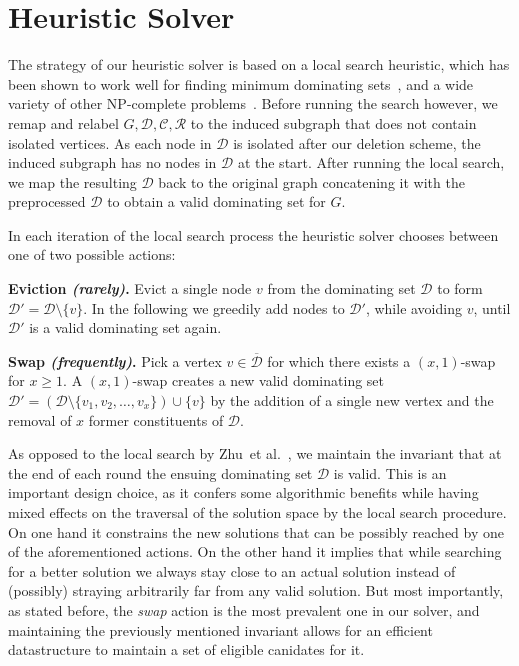 \documentclass[a4paper, USenglish, cleveref, autoref, thm-restate, noalgorithm2e]{socg-lipics-v2021}
\newcommand{\etal}{et al.\xspace}
\newcommand{\domset}{\ensuremath{\mathcal D}\xspace}
\newcommand{\cov}{\ensuremath{\mathcal C}\xspace}
\newcommand{\red}{\ensuremath{\mathcal R}\xspace}
\newcommand{\cdomset}{\ensuremath{\overline{\mathcal D}}\xspace}
\begin{document}
\section{Heuristic Solver}\label{sec:heuristic}
The strategy of our heuristic solver is based on a local search heuristic, which has been shown to work well for finding minimum dominating sets~\cite{DBLP:journals/kbs/ZhuZWSL24}, and a wide variety of other NP-complete problems~\cite{DBLP:journals/jair/CaiSLS13,DBLP:conf/compgeom/MustafaR09}.
Before running the search however, we remap and relabel $G, \domset, \cov, \red$ to the induced subgraph that does not contain isolated vertices.
As each node in $\domset$ is isolated after our deletion scheme, the induced subgraph has no nodes in $\domset$ at the start.
After running the local search, we map the resulting $\domset$ back to the original graph concatening it with the preprocessed $\domset$ to obtain a valid dominating set for $G$. 

In each iteration of the local search process the heuristic solver chooses between one of two possible actions:
\medskip

\noindent
\textbf{Eviction \textit{(rarely)}.} 
Evict a single node $v$ from the dominating set $\domset$ to form $\domset'=\domset\setminus\{v\}$.
In the following we greedily add nodes to $\domset'$, while avoiding $v$, until $\domset'$ is a valid dominating set again.
\medskip

\noindent
\textbf{Swap \textit{(frequently)}.}
Pick a vertex $v \in \cdomset$ for which there exists a $(x,1)$-swap for $x\geq 1$.
%
A $(x,1)$-swap creates a new valid dominating set $\domset' = (\domset\setminus \{v_1,v_2,\ldots,v_x\}) \cup \{v\}$ by the addition of a single new vertex and the removal of $x$ former constituents of $\domset$.

As opposed to the local search by Zhu~\etal~\cite{DBLP:journals/kbs/ZhuZWSL24}, we maintain the invariant that at the end of each round the ensuing dominating set $\domset$ is valid.
%
This is an important design choice, as it confers some algorithmic benefits while having mixed effects on the traversal of the solution space by the local search procedure.
%
On one hand it constrains the new solutions that can be possibly reached by one of the aforementioned actions.
%
On the other hand it implies that while searching for a better solution we always stay close to an actual solution instead of (possibly) straying arbitrarily far from any valid solution.
%
But most importantly, as stated before, the \textit{swap} action is the most prevalent one in our solver, and maintaining the previously mentioned invariant allows for an efficient datastructure to maintain a set of eligible canidates for it.
\end{document}
